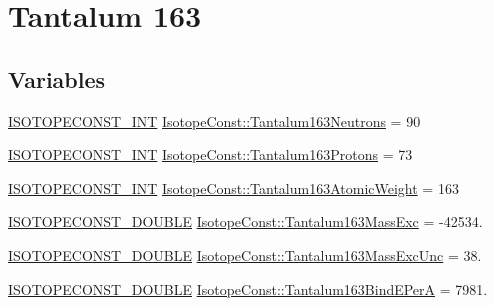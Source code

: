 \hypertarget{group___isotope_const-_tantalum-_ta163}{}\section{Tantalum 163}
\label{group___isotope_const-_tantalum-_ta163}
\subsection*{Variables}
\begin{DoxyCompactItemize}
\item 
\mbox{\hyperlink{group___isotope_const-_macros_ga5f18360b3e99483a35c32d789e62621c}{I\+S\+O\+T\+O\+P\+E\+C\+O\+N\+S\+T\+\_\+\+I\+NT}} \mbox{\hyperlink{group___isotope_const-_tantalum-_ta163_ga3df8869324d1c83876bdeed669af6dfa}{Isotope\+Const\+::\+Tantalum163\+Neutrons}} = 90
\item 
\mbox{\hyperlink{group___isotope_const-_macros_ga5f18360b3e99483a35c32d789e62621c}{I\+S\+O\+T\+O\+P\+E\+C\+O\+N\+S\+T\+\_\+\+I\+NT}} \mbox{\hyperlink{group___isotope_const-_tantalum-_ta163_ga91bba8586d06febc94733f54e1cdbd79}{Isotope\+Const\+::\+Tantalum163\+Protons}} = 73
\item 
\mbox{\hyperlink{group___isotope_const-_macros_ga5f18360b3e99483a35c32d789e62621c}{I\+S\+O\+T\+O\+P\+E\+C\+O\+N\+S\+T\+\_\+\+I\+NT}} \mbox{\hyperlink{group___isotope_const-_tantalum-_ta163_ga03c9f92c5fac869345e78896c5829cd2}{Isotope\+Const\+::\+Tantalum163\+Atomic\+Weight}} = 163
\item 
\mbox{\hyperlink{group___isotope_const-_macros_ga8f45a7272ce02c0b4c65c44636ed719a}{I\+S\+O\+T\+O\+P\+E\+C\+O\+N\+S\+T\+\_\+\+D\+O\+U\+B\+LE}} \mbox{\hyperlink{group___isotope_const-_tantalum-_ta163_ga1d9ce288029d0e18640e885ea58d0384}{Isotope\+Const\+::\+Tantalum163\+Mass\+Exc}} = -\/42534.
\item 
\mbox{\hyperlink{group___isotope_const-_macros_ga8f45a7272ce02c0b4c65c44636ed719a}{I\+S\+O\+T\+O\+P\+E\+C\+O\+N\+S\+T\+\_\+\+D\+O\+U\+B\+LE}} \mbox{\hyperlink{group___isotope_const-_tantalum-_ta163_gaeef3fd9c24a59492131f2b06e349e7a4}{Isotope\+Const\+::\+Tantalum163\+Mass\+Exc\+Unc}} = 38.
\item 
\mbox{\hyperlink{group___isotope_const-_macros_ga8f45a7272ce02c0b4c65c44636ed719a}{I\+S\+O\+T\+O\+P\+E\+C\+O\+N\+S\+T\+\_\+\+D\+O\+U\+B\+LE}} \mbox{\hyperlink{group___isotope_const-_tantalum-_ta163_ga71246f1ee138adf570e01a4909897fe4}{Isotope\+Const\+::\+Tantalum163\+Bind\+E\+PerA}} = 7981.
\item 

\end{DoxyCompactItemize}
